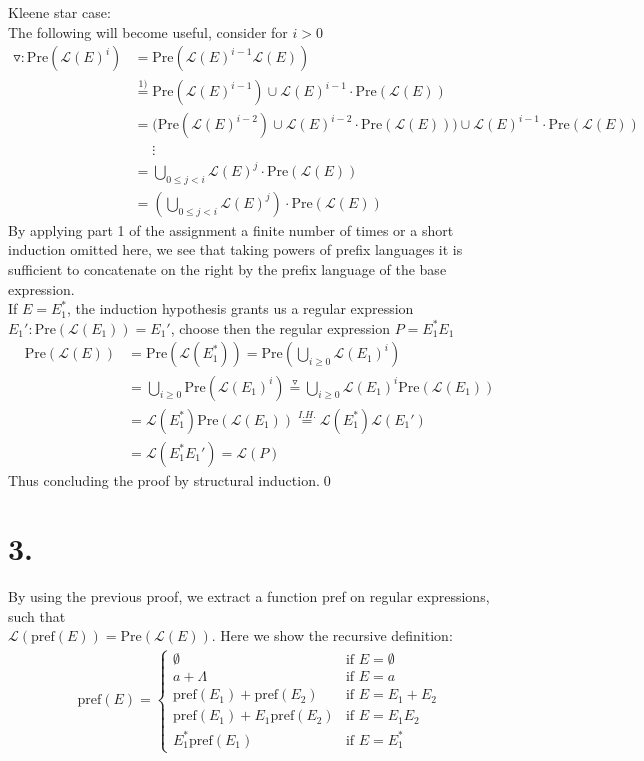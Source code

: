 \documentclass{article}
\theoremstyle{remark}
\numberwithin{equation}{section}
\begin{document}
	\noindent Kleene star case:\\ The following will become useful, consider for $i>0$
	\begin{align*}
	\triangledown: \text{Pre}(\mathcal{L}(E)^i) &= \text{Pre}(\mathcal{L}(E)^{i-1}\mathcal{L}(E))\\
	&\stackrel{1)}{=} \text{Pre}(\mathcal{L}(E)^{i-1})\cup\mathcal{L}(E)^{i-1}\cdot\text{Pre}(\mathcal{L}(E))\\
	&=\bigg(\text{Pre}(\mathcal{L}(E)^{i-2})\cup\mathcal{L}(E)^{i-2}\cdot\text{Pre}(\mathcal{L}(E))\bigg)\cup\mathcal{L}(E)^{i-1}\cdot\text{Pre}(\mathcal{L}(E))\\
	&\text{ }\text{ }\vdots\\
	&= \bigcup_{0\leq j < i} \mathcal{L}(E)^j \cdot \text{Pre}(\mathcal{L}(E))\\
	&= \left(\bigcup_{0\leq j < i} \mathcal{L}(E)^j\right) \cdot \text{Pre}(\mathcal{L}(E)) 
	\end{align*}
	By applying part 1 of the assignment a finite number of times or a short induction omitted here, we see that taking powers of prefix languages it is sufficient to concatenate on the right by the prefix language of the base expression.\\
	If $E = E_1^*$, the induction hypothesis grants us a regular expression $E_1': \text{Pre}(\mathcal{L}(E_1)) = E_1'$, choose then the regular expression $P=E_1^*E_1$\\
	\begin{align*}
	\text{Pre}(\mathcal{L}(E))&= \text{Pre}(\mathcal{L}(E_1^*)) = \text{Pre}\left( \bigcup_{i\geq 0} \mathcal{L}(E_1)^i \right)\\
	&=\bigcup_{i\geq 0} \text{Pre}(\mathcal{L}(E_1)^i) \stackrel{\triangledown}{=} \bigcup_{i\geq 0} \mathcal{L}(E_1)^i \text{Pre}(\mathcal{L}(E_1))\\
	&=\mathcal{L}(E_1^*)\text{Pre}(\mathcal{L}(E_1)) \stackrel{I.H.}{=} \mathcal{L}(E_1^*)\mathcal{L}(E_1')\\
	&=\mathcal{L}(E_1^*E_1') = \mathcal{L}(P)
	\end{align*}
	Thus concluding the proof by structural induction.\qed
	\section*{3.}
	By using the previous proof, we extract a function pref on regular expressions, such that\\
	$\mathcal{L}(\text{pref}(E))= \text{Pre}(\mathcal{L}(E))$. Here we show the recursive definition:
	\begin{align*}\label{recursion}
	\text{pref}(E) = \begin{cases}
	\emptyset & \text{if } E= \emptyset\\
	a + \Lambda & \text{if } E=a\\
	\text{pref} (E_1) + \text{pref} (E_2) & \text{if } E=E_1+E_2\\
	\text{pref} (E_1) + E_1 \text{pref} (E_2) & \text{if } E= E_1E_2\\
	E_{1}^* \text{pref} (E_1) & \text{if } E= E_{1}^*
	\end{cases}
	\end{align*}	
\end{document}
